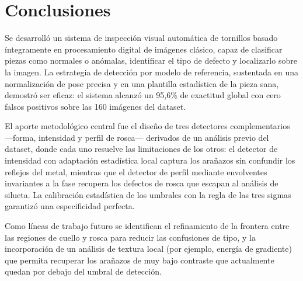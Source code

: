 \documentclass[final]{article}
\begin{document}
\section{Conclusiones}

Se desarrolló un sistema de inspección visual automática de tornillos basado
íntegramente en procesamiento digital de imágenes clásico, capaz de clasificar
piezas como normales o anómalas, identificar el tipo de defecto y localizarlo
sobre la imagen. La estrategia de detección por modelo de referencia, sustentada
en una normalización de pose precisa y en una plantilla estadística de la pieza
sana, demostró ser eficaz: el sistema alcanzó un 95{,}6\% de exactitud global
con cero falsos positivos sobre las 160 imágenes del dataset.

El aporte metodológico central fue el diseño de tres detectores complementarios
—forma, intensidad y perfil de rosca— derivados de un análisis previo del
dataset, donde cada uno resuelve las limitaciones de los otros: el detector de
intensidad con adaptación estadística local captura los arañazos sin confundir
los reflejos del metal, mientras que el detector de perfil mediante envolventes
invariantes a la fase recupera los defectos de rosca que escapan al análisis de
silueta. La calibración estadística de los umbrales con la regla de las tres
sigmas garantizó una especificidad perfecta.

Como líneas de trabajo futuro se identifican el refinamiento de la frontera
entre las regiones de cuello y rosca para reducir las confusiones de tipo, y la
incorporación de un análisis de textura local (por ejemplo, energía de
gradiente) que permita recuperar los arañazos de muy bajo contraste que
actualmente quedan por debajo del umbral de detección.



\end{document}
